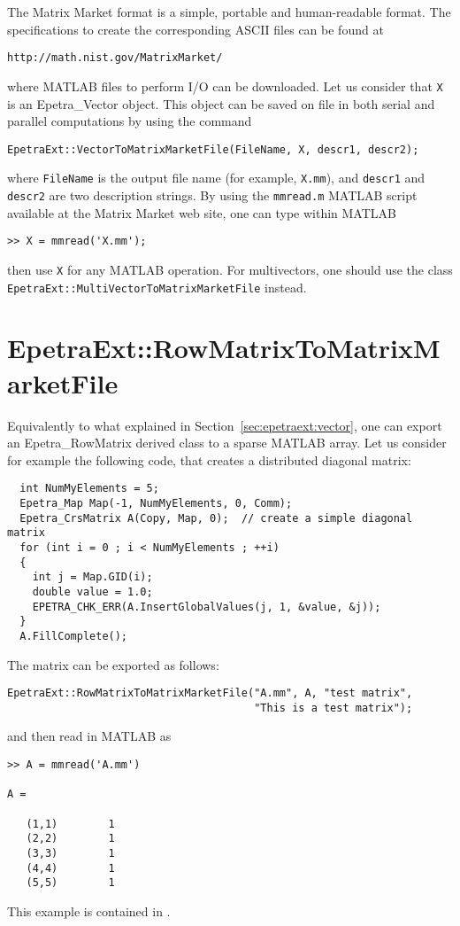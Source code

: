 The Matrix Market format is a simple, portable and human-readable format. The
specifications to create the corresponding ASCII files can be found at
\begin{verbatim}
http://math.nist.gov/MatrixMarket/
\end{verbatim}
where MATLAB files to perform I/O can be downloaded. Let us consider that
\verb!X! is an Epetra\_Vector object. This object can be saved on file 
in both serial and parallel computations by using the command
\begin{verbatim}
EpetraExt::VectorToMatrixMarketFile(FileName, X, descr1, descr2);
\end{verbatim}
where \verb!FileName! is the output file name (for example, {\tt X.mm}), and \verb!descr1! and
\verb!descr2! are two description strings. By using the \verb!mmread.m! MATLAB
script available at the Matrix Market web site, one can type within MATLAB
\begin{verbatim}
>> X = mmread('X.mm');
\end{verbatim}
then use \verb!X! for any MATLAB operation. For multivectors, one should use
the class \\
      \verb!EpetraExt::MultiVectorToMatrixMarketFile! instead.

\section{EpetraExt::RowMatrixToMatrixMarketFile}
\label{sec:epetraext:rowmatrix}

Equivalently to what explained in Section~\ref{sec:epetraext:vector}, one can
export an Epetra\_RowMatrix derived class to a sparse MATLAB array. Let us
consider for example the following code, that creates a distributed diagonal
matrix:
\begin{verbatim}
  int NumMyElements = 5;
  Epetra_Map Map(-1, NumMyElements, 0, Comm);
  Epetra_CrsMatrix A(Copy, Map, 0);  // create a simple diagonal matrix  
  for (int i = 0 ; i < NumMyElements ; ++i)  
  {
    int j = Map.GID(i);
    double value = 1.0;    
    EPETRA_CHK_ERR(A.InsertGlobalValues(j, 1, &value, &j));
  }
  A.FillComplete();
\end{verbatim}
The matrix can be exported as follows:
\begin{verbatim}
EpetraExt::RowMatrixToMatrixMarketFile("A.mm", A, "test matrix", 
                                       "This is a test matrix");
\end{verbatim}
and then read in MATLAB as
\begin{verbatim}
>> A = mmread('A.mm')                                       

A =

   (1,1)        1
   (2,2)        1
   (3,3)        1
   (4,4)        1
   (5,5)        1
\end{verbatim}
This example is contained in .


